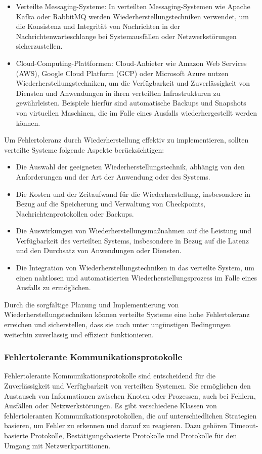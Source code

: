\begin{itemize}
\item Verteilte Messaging-Systeme: In verteilten Messaging-Systemen wie Apache Kafka oder RabbitMQ werden Wiederherstellungstechniken verwendet, um die Konsistenz und Integrität von Nachrichten in der Nachrichtenwarteschlange bei Systemausfällen oder Netzwerkstörungen sicherzustellen.
\item Cloud-Computing-Plattformen: Cloud-Anbieter wie Amazon Web Services (AWS), Google Cloud Platform (GCP) oder Microsoft Azure nutzen Wiederherstellungstechniken, um die Verfügbarkeit und Zuverlässigkeit von Diensten und Anwendungen in ihren verteilten Infrastrukturen zu gewährleisten. Beispiele hierfür sind automatische Backups und Snapshots von virtuellen Maschinen, die im Falle eines Ausfalls wiederhergestellt werden können.
\end{itemize}
Um Fehlertoleranz durch Wiederherstellung effektiv zu implementieren, sollten verteilte Systeme folgende Aspekte berücksichtigen:
\begin{itemize}
\item Die Auswahl der geeigneten Wiederherstellungstechnik, abhängig von den Anforderungen und der Art der Anwendung oder des Systems.
\item Die Kosten und der Zeitaufwand für die Wiederherstellung, insbesondere in Bezug auf die Speicherung und Verwaltung von Checkpoints, Nachrichtenprotokollen oder Backups.
\item Die Auswirkungen von Wiederherstellungsmaßnahmen auf die Leistung und Verfügbarkeit des verteilten Systems, insbesondere in Bezug auf die Latenz und den Durchsatz von Anwendungen oder Diensten.
\item Die Integration von Wiederherstellungstechniken in das verteilte System, um einen nahtlosen und automatisierten Wiederherstellungsprozess im Falle eines Ausfalls zu ermöglichen.
\end{itemize}
Durch die sorgfältige Planung und Implementierung von Wiederherstellungstechniken können verteilte Systeme eine hohe Fehlertoleranz erreichen und sicherstellen, dass sie auch unter ungünstigen Bedingungen weiterhin zuverlässig und effizient funktionieren.

\subsubsection{Fehlertolerante Kommunikationsprotokolle}

Fehlertolerante Kommunikationsprotokolle sind entscheidend für die Zuverlässigkeit und Verfügbarkeit von verteilten Systemen. Sie ermöglichen den Austausch von Informationen zwischen Knoten oder Prozessen, auch bei Fehlern, Ausfällen oder Netzwerkstörungen. Es gibt verschiedene Klassen von fehlertoleranten Kommunikationsprotokollen, die auf unterschiedlichen Strategien basieren, um Fehler zu erkennen und darauf zu reagieren. Dazu gehören Timeout-basierte Protokolle, Bestätigungsbasierte Protokolle und Protokolle für den Umgang mit Netzwerkpartitionen.

